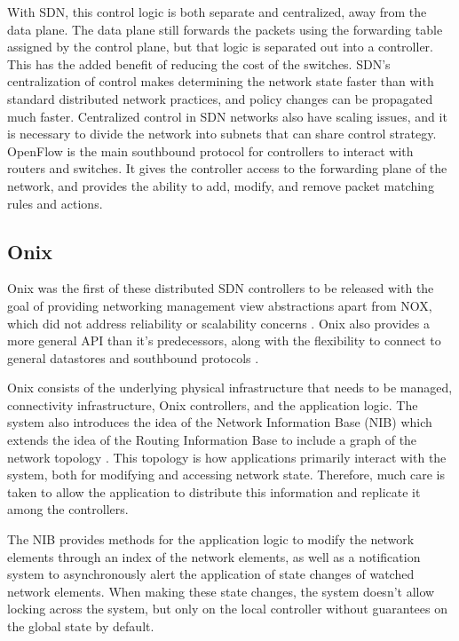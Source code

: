 \documentclass[letterpaper,twocolumn,10pt]{article}
\begin{document}
With SDN, this control logic is both separate and centralized, away from the data plane. The data plane still forwards the packets using the forwarding table assigned by the control plane, but that logic is separated out into a controller. This has the added benefit of reducing the cost of the switches. SDN's centralization of control makes determining the network state faster than with standard distributed network practices, and policy changes can be propagated much faster.
Centralized control in SDN networks also have scaling issues, and it is necessary to divide the network into subnets that can share control strategy. OpenFlow is the main southbound protocol for controllers to interact with routers and switches. It gives the controller access to the forwarding plane of the network, and provides the ability to add, modify, and remove packet matching rules and actions.\cite{mckeown2008openflow}

% 
% 
\subsection{Onix}

Onix was the first of these distributed SDN controllers to be released with the goal of providing networking management view abstractions apart from NOX, which did not address reliability or scalability concerns \cite{feamster2014road}. Onix also provides a more general API than it's predecessors, along with the flexibility to connect to general datastores and southbound protocols \cite{koponen2010onix}.

Onix consists of the underlying physical infrastructure that needs to be managed, connectivity infrastructure, Onix controllers, and the application logic. The system also introduces the idea of the Network Information Base (NIB) which extends the idea of the Routing Information Base to include a graph of the network topology \cite{network2015topologies}. This topology is how applications primarily interact with the system, both for modifying and accessing network state. Therefore, much care is taken to allow the application to distribute this information and replicate it among the controllers.

The NIB provides methods for the application logic to modify the network elements through an index of the network elements, as well as a notification system to asynchronously alert the application of state changes of watched network elements. When making these state changes, the system doesn't allow locking across the system, but only on the local controller without guarantees on the global state by default. 
\end{document}
